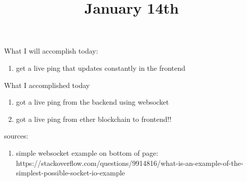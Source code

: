 \title{January 14th}

What I will accomplish today:

\begin{enumerate}
	\item get a live ping that updates constantly in the frontend
\end{enumerate}

What I accomplished today

\begin{enumerate}
	\item got a live ping from the backend using websocket
	\item got a live ping from ether blockchain to frontend!!
\end{enumerate}

sources:

\begin{enumerate}
	\item simple websocket example on bottom of page: https://stackoverflow.com/questions/9914816/what-is-an-example-of-the-simplest-possible-socket-io-example
\end{enumerate}

